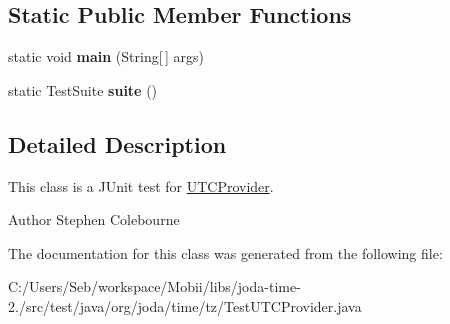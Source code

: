 \subsection*{Static Public Member Functions}
\begin{DoxyCompactItemize}
\item 
\hypertarget{classorg_1_1joda_1_1time_1_1tz_1_1_test_u_t_c_provider_af68565294788da63429626680f327b0c}{static void {\bfseries main} (String\mbox{[}$\,$\mbox{]} args)}\label{classorg_1_1joda_1_1time_1_1tz_1_1_test_u_t_c_provider_af68565294788da63429626680f327b0c}

\item 
\hypertarget{classorg_1_1joda_1_1time_1_1tz_1_1_test_u_t_c_provider_aa2b3551cb28fb37fda49a74522b9be1a}{static Test\-Suite {\bfseries suite} ()}\label{classorg_1_1joda_1_1time_1_1tz_1_1_test_u_t_c_provider_aa2b3551cb28fb37fda49a74522b9be1a}

\end{DoxyCompactItemize}


\subsection{Detailed Description}
This class is a J\-Unit test for \hyperlink{classorg_1_1joda_1_1time_1_1tz_1_1_u_t_c_provider}{U\-T\-C\-Provider}.

\begin{DoxyAuthor}{Author}
Stephen Colebourne 
\end{DoxyAuthor}


The documentation for this class was generated from the following file\-:\begin{DoxyCompactItemize}
\item 
C\-:/\-Users/\-Seb/workspace/\-Mobii/libs/joda-\/time-\/2./src/test/java/org/joda/time/tz/Test\-U\-T\-C\-Provider.\-java\end{DoxyCompactItemize}
